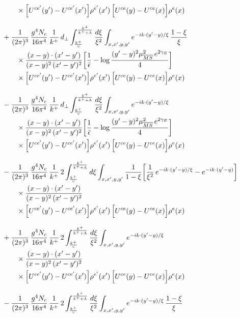 \documentclass[10pt]{article}
\begin{document}
\begin{align}
&\qquad\times\Big[U^{ce'}(y')-U^{ce'}(x')\Big]\rho^{e'}(x')\,\Big[U^{ce}(y)-U^{ce}(x)\Big]\rho^{e}(x)\notag\\[8pt]
&+\frac{1}{(2\pi)^{3}}\,\frac{g^{4}N_{c}}{16\pi^{4}}\,\frac{1}{k^{+}}\,d_{\perp}\int_{\frac{k^{+}}{\vee}}^{\frac{k^{+}}{k^{+}+\Lambda}}\frac{d\xi}{\xi^{2}}\int_{x,x',y,y'}e^{-ik\cdot(y'-y)/\xi}\,\frac{1-\xi}{\xi}\notag\\
&\qquad\times\frac{(x-y)\cdot(x'-y')}{(x-y)^{2}\,(x'-y')^{2}}\bigg[\frac{1}{\bar\epsilon}-\log\frac{(y'-y)^{2}\mu^{2}_{\overline{MS}}\,e^{2\gamma_{E}}}{4}\bigg]\notag\\
&\qquad\times\Big[U^{ce'}(y')-U^{ce'}(x')\Big]\rho^{e'}(x')\,\Big[U^{ce}(y)-U^{ce}(x)\Big]\rho^{e}(x)\notag\\[8pt]
&-\frac{1}{(2\pi)^{3}}\,\frac{g^{4}N_{c}}{16\pi^{4}}\,\frac{1}{k^{+}}\,d_{\perp}\int_{\frac{k^{+}}{\vee}}^{\frac{k^{+}}{k^{+}+\Lambda}}\frac{d\xi}{\xi^{2}}\int_{x,x',y,y'}e^{-ik\cdot(y'-y)/\xi}\notag\\
&\qquad\times\frac{(x-y)\cdot(x'-y')}{(x-y)^{2}\,(x'-y')^{2}}\bigg[\frac{1}{\bar\epsilon}-\log\frac{(y'-y)^{2}\mu^{2}_{\overline{MS}}\,e^{2\gamma_{E}}}{4}\bigg]\notag\\
&\qquad\times\Big[U^{ce'}(y')-U^{ce'}(x')\Big]\rho^{e'}(x')\,\Big[U^{ce}(y)-U^{ce}(x)\Big]\rho^{e}(x)\notag\\[8pt]
&-\frac{1}{(2\pi)^{3}}\,\frac{g^{4}N_{c}}{16\pi^{4}}\,\frac{1}{k^{+}}\,2\int_{\frac{k^{+}}{\vee}}^{\frac{k^{+}}{k^{+}+\Lambda}}d\xi\int_{x,x',y,y'}\frac{1}{1-\xi}\bigg[\frac{1}{\xi^{2}}\,e^{-ik\cdot(y'-y)/\xi}-e^{-ik\cdot(y'-y)}\bigg]\notag\\
&\qquad\times\frac{(x-y)\cdot(x'-y')}{(x-y)^{2}\,(x'-y')^{2}}\notag\\
&\qquad\times\Big[U^{ce'}(y')-U^{ce'}(x')\Big]\rho^{e'}(x')\,\Big[U^{ce}(y)-U^{ce}(x)\Big]\rho^{e}(x)\notag\\[8pt]
&+\frac{1}{(2\pi)^{3}}\,\frac{g^{4}N_{c}}{16\pi^{4}}\,\frac{1}{k^{+}}\,2\int_{\frac{k^{+}}{\vee}}^{\frac{k^{+}}{k^{+}+\Lambda}}\frac{d\xi}{\xi^{2}}\int_{x,x',y,y'}e^{-ik\cdot(y'-y)/\xi}\notag\\
&\qquad\times\frac{(x-y)\cdot(x'-y')}{(x-y)^{2}\,(x'-y')^{2}}\notag\\
&\qquad\times\Big[U^{ce'}(y')-U^{ce'}(x')\Big]\rho^{e'}(x')\,\Big[U^{ce}(y)-U^{ce}(x)\Big]\rho^{e}(x)\notag\\[8pt]
&-\frac{1}{(2\pi)^{3}}\,\frac{g^{4}N_{c}}{16\pi^{4}}\,\frac{1}{k^{+}}\,2\int_{\frac{k^{+}}{\vee}}^{\frac{k^{+}}{k^{+}+\Lambda}}\frac{d\xi}{\xi^{2}}\int_{x,x',y,y'}e^{-ik\cdot(y'-y)/\xi}\,\frac{1-\xi}{\xi}\notag\\

\end{align}
\end{document}

